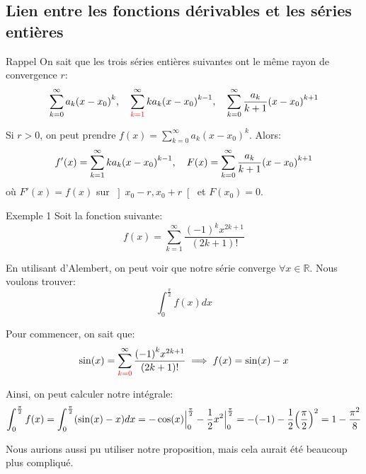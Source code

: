 \documentclass[a4paper]{article}
\begin{document}
\subsection[Fonctions dérivables et séries entières]{Lien entre les fonctions dérivables et les séries entières}
\begin{parag}{Rappel}
    On sait que les trois séries entières suivantes ont le même rayon de convergence $r$: 
    \[\sum_{k=0}^{\infty} a_k\left(x - x_0\right)^k, \mathspace \sum_{{\color{red}k=1}}^{\infty} k a_k\left(x - x_0\right)^{k-1}, \mathspace \sum_{k=0}^{\infty} \frac{a_k}{k + 1}\left(x - x_0\right)^{k+1}\]

    Si $r > 0$, on peut prendre $f\left(x\right) = \sum_{k=0}^{\infty} a_k\left(x - x_0\right)^k$. Alors: 
    \[f'\left(x\right) = \sum_{k=1}^{\infty} ka_k\left(x - x_0\right)^{k-1}, \mathspace F\left(x\right) = \sum_{k=0}^{\infty} \frac{a_k}{k+1}\left(x - x_0\right)^{k+1}\]
    où $F'\left(x\right) = f\left(x\right)$ sur $\left]x_0 - r, x_0 + r\right[ $ et $F\left(x_0\right) = 0$.
\end{parag}

\begin{parag}{Exemple 1}
    Soit la fonction suivante: 
    \[f\left(x\right) = \sum_{k=1}^{\infty} \frac{\left(-1\right)^k x^{2k+1}}{\left(2k + 1\right)!}\]
    
    En utilisant d'Alembert, on peut voir que notre série converge $\forall x \in \mathbb{R}$. Nous voulons trouver: 
    \[\int_{0}^{\frac{\pi}{2}} f\left(x\right)dx\]
    

    Pour commencer, on sait que: 
    \[\sin\left(x\right)= \sum_{{\color{red}k=0}}^{\infty} \frac{\left(-1\right)^k x^{2k+1}}{\left(2k + 1\right)!} \implies f\left(x\right) = \sin\left(x\right) - x\]

    Ainsi, on peut calculer notre intégrale: 
    \[\int_{0}^{\frac{\pi}{2}}f\left(x\right) = \int_{0}^{\frac{\pi}{2}} \left(\sin\left(x\right)- x\right)dx = -\cos\left(x\right) \eval_{0}^{\frac{\pi}{2}} - \frac{1}{2} x^2 \eval_{0}^{\frac{\pi}{2}} = -\left(-1\right) - \frac{1}{2} \left(\frac{\pi}{2}\right)^2 = 1 - \frac{\pi^2}{8}\]
    
    Nous aurions aussi pu utiliser notre proposition, mais cela aurait été beaucoup plus compliqué. 
\end{parag}
\end{document}
